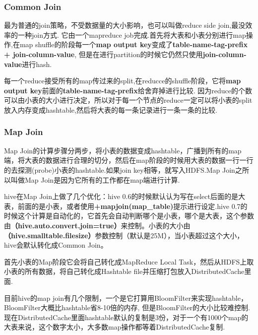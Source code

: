 \subsubsection{Common Join}
\par 最为普通的join策略，不受数据量的大小影响，也可以叫做reduce side join,最没效率的一种join方式. 它由一个mapreduce job完成.首先将大表和小表分别进行map操作,在map shuffle的阶段每一个\textbf{map output key}变成了\textbf{table-name-tag-prefix + join-column-value}, 但是在进行partition的时候它仍然只使用\textbf{join-column-value}进行hash.
\par 每一个reduce接受所有的map传过来的split,在reducce的shuffle阶段，它将\textbf{map output key}前面的\textbf{table-name-tag-prefix}给舍弃掉进行比较. 因为reduce的个数可以由小表的大小进行决定，所以对于每一个节点的reduce一定可以将小表的split放入内存变成hashtable,然后将大表的每一条记录进行一条一条的比较.
\subsubsection{Map Join}
\par Map Join的计算步骤分两步，将小表的数据变成hashtable，广播到所有的map端，将大表的数据进行合理的切分，然后在map阶段的时候用大表的数据一行一行的去探测(probe)小表的hashtable.如果join key相等，就写入HDFS.Map Join之所以叫做Map Join是因为它所有的工作都在map端进行计算.
\par hive在Map Join上做了几个优化：hive 0.6的时候默认认为写在select后面的是大表，前面的是小表，或者使用\textbf{+mapjoin(map\_table)}提示进行设定.hive 0.7的时候这个计算是自动化的，它首先会自动判断哪个是小表，哪个是大表，这个参数由\textbf{（hive.auto.convert.join=true）}来控制。小表的大小由\textbf{（hive.smalltable.filesize）}参数控制（默认是25M），当小表超过这个大小，hive会默认转化成Common Join。
\par 首先小表的Map阶段它会将自己转化成MapReduce Local Task，然后从HDFS上取小表的所有数据，将自己转化成Hashtable file并压缩打包放入DistributedCache里面.
\par 目前hive的map join有几个限制，一个是它打算用BloomFilter来实现hashtable，BloomFilter大概比hashtable省8-10倍的内存, 但是BloomFilter的大小比较难控制.现在DistributedCache里面hashtable默认的复制是3份，对于一个有1000个map的大表来说，这个数字太小，大多数map操作都等着DistributedCache复制.
